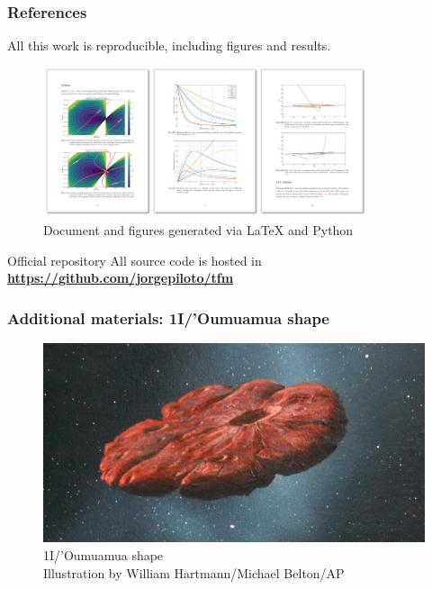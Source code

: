 \documentclass[xcolor={dvipsnames}]{beamer}
\begin{document}
\begin{frame}
\frametitle{References}

All this work is reproducible, including figures and results.

\vspace{0.15cm}
\begin{figure}[h]
    \centering
    \includegraphics[width=0.85\textwidth]{fig/static/thumbnails.png}
        \caption{Document and figures generated via LaTeX and Python}
    \label{fig:oumuamua-shape}
\end{figure}

\vspace{-0.15cm}
\begin{alertblock}{Official repository}
\vspace{0.1cm}
All source code is hosted in \textbf{\href{https://github.com/jorgepiloto/tfm}{https://github.com/jorgepiloto/tfm}}
\vspace{0.1cm}
\end{alertblock}

\end{frame}

\begin{frame}
\frametitle{Additional materials: 1I/'Oumuamua shape}

\begin{figure}[h]
    \centering
    \includegraphics[width=\textwidth]{fig/static/oumuamua-shape.png}
        \caption{1I/'Oumuamua shape\\\tiny{Illustration by William Hartmann/Michael Belton/AP}}
    \label{fig:oumuamua-shape}
\end{figure}

\end{frame}
\end{document}
